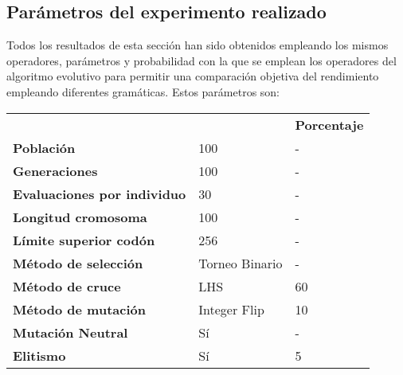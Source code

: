 \subsection{Parámetros del experimento realizado} \label{sec:params}
Todos los resultados de esta sección han sido obtenidos empleando los mismos operadores, parámetros y probabilidad con la que se emplean los operadores del algoritmo evolutivo para permitir una comparación objetiva del rendimiento empleando diferentes gramáticas. Estos parámetros son:
\begin{table}[H]
\centering
\begin{tabular}{lll}
\cline{3-3}
                                                         &                & \textbf{Porcentaje} \\ \cline{3-3} 
\multicolumn{1}{|l|}{\textbf{Población}}                          & 100            & -          \\
\multicolumn{1}{|l|}{\textbf{Generaciones}}                       & 100            & -          \\
\multicolumn{1}{|l|}{\textbf{Evaluaciones por individuo}} & 30             & -          \\
\multicolumn{1}{|l|}{\textbf{Longitud cromosoma}}                 & 100            & -          \\
\multicolumn{1}{|l|}{\textbf{Límite superior codón\footnotemark[2]}}              & 256            & -          \\
\multicolumn{1}{|l|}{\textbf{Método de selección}}                & Torneo Binario\footnotemark[3]& -          \\
\multicolumn{1}{|l|}{\textbf{Método de cruce}}                    & LHS            & 60         \\
\multicolumn{1}{|l|}{\textbf{Método de mutación}}                 & Integer Flip   & 10         \\
\multicolumn{1}{|l|}{\textbf{Mutación Neutral}}                   & Sí             & -          \\
\multicolumn{1}{|l|}{\textbf{Elitismo}}                           & Sí             & 5         
\end{tabular}
\end{table}

